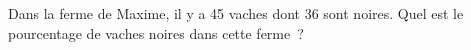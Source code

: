 \documentclass[exercice]{thedocument}%
\begin{document}
%
Dans la ferme de Maxime, il y a 45 vaches dont 36 sont noires.
\vskip10pt\noindent Quel est le pourcentage de vaches noires dans cette ferme~?
\end{document}
